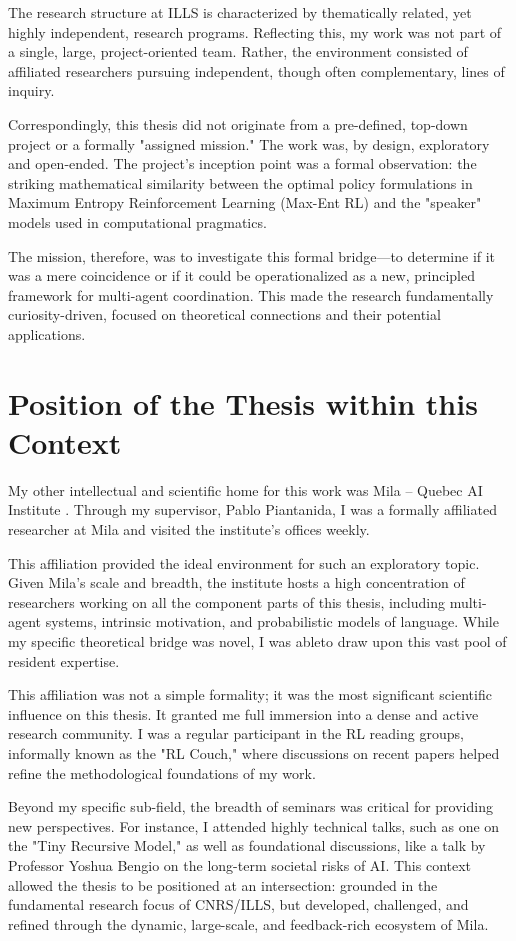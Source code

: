 \documentclass[12pt, a4paper]{report}
\begin{document}
The research structure at ILLS is characterized by thematically related, yet highly independent, research programs. Reflecting this, my work was not part of a single, large, project-oriented team. Rather, the environment consisted of affiliated researchers pursuing independent, though often complementary, lines of inquiry.

Correspondingly, this thesis did not originate from a pre-defined, top-down project or a formally "assigned mission." The work was, by design, exploratory and open-ended. The project's inception point was a formal observation: the striking mathematical similarity between the optimal policy formulations in Maximum Entropy Reinforcement Learning (Max-Ent RL) and the "speaker" models used in computational pragmatics.

The mission, therefore, was to investigate this formal bridge—to determine if it was a mere coincidence or if it could be operationalized as a new, principled framework for multi-agent coordination. This made the research fundamentally curiosity-driven, focused on theoretical connections and their potential applications.

\section{Position of the Thesis within this Context}

My other intellectual and scientific home for this work was Mila -- Quebec AI Institute \cite{Mila}. Through my supervisor, Pablo Piantanida, I was a formally affiliated researcher at Mila and visited the institute's offices weekly.

This affiliation provided the ideal environment for such an exploratory topic. Given Mila's scale and breadth, the institute hosts a high concentration of researchers working on all the component parts of this thesis, including multi-agent systems, intrinsic motivation, and probabilistic models of language. While my specific theoretical bridge was novel, I was ableto draw upon this vast pool of resident expertise.

This affiliation was not a simple formality; it was the most significant scientific influence on this thesis. It granted me full immersion into a dense and active research community. I was a regular participant in the RL reading groups, informally known as the "RL Couch," where discussions on recent papers helped refine the methodological foundations of my work.

Beyond my specific sub-field, the breadth of seminars was critical for providing new perspectives. For instance, I attended highly technical talks, such as one on the "Tiny Recursive Model," \cite{jolicoeur2025less} as well as foundational discussions, like a talk by Professor Yoshua Bengio on the long-term societal risks of AI. This context allowed the thesis to be positioned at an intersection: grounded in the fundamental research focus of CNRS/ILLS, but developed, challenged, and refined through the dynamic, large-scale, and feedback-rich ecosystem of Mila.
\end{document}
